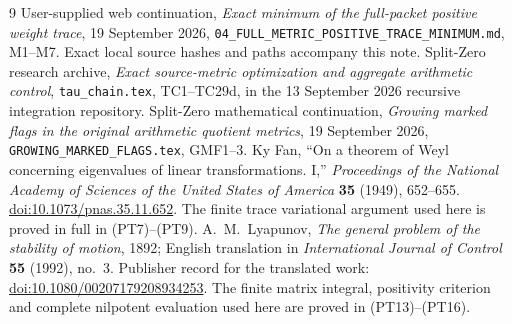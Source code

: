 \documentclass[11pt]{article}
\begin{document}
\begin{thebibliography}{9}
User-supplied web continuation, \emph{Exact minimum of the full-packet
positive weight trace}, 19 September 2026,
\texttt{04\_FULL\_METRIC\_POSITIVE\_TRACE\_MINIMUM.md}, M1--M7.
Exact local source hashes and paths accompany this note.
Split-Zero research archive, \emph{Exact source-metric optimization and
aggregate arithmetic control}, \texttt{tau\_chain.tex}, TC1--TC29d,
in the 13 September 2026 recursive integration repository.
Split-Zero mathematical continuation, \emph{Growing marked flags in
the original arithmetic quotient metrics}, 19 September 2026,
\texttt{GROWING\_MARKED\_FLAGS.tex}, GMF1--3.
Ky Fan, ``On a theorem of Weyl concerning eigenvalues of linear
transformations. I,'' \emph{Proceedings of the National Academy of
Sciences of the United States of America} \textbf{35} (1949), 652--655.
\href{https://doi.org/10.1073/pnas.35.11.652}{doi:10.1073/pnas.35.11.652}.
The finite trace variational argument used here is proved in full
in (PT7)--(PT9).
A.~M.~Lyapunov, \emph{The general problem of the stability of motion},
1892; English translation in \emph{International Journal of Control}
\textbf{55} (1992), no.~3. Publisher record for the translated work:
\href{https://doi.org/10.1080/00207179208934253}{doi:10.1080/00207179208934253}.
The finite matrix integral, positivity criterion and complete
nilpotent evaluation used here are proved in (PT13)--(PT16).
\end{thebibliography}
\end{document}
